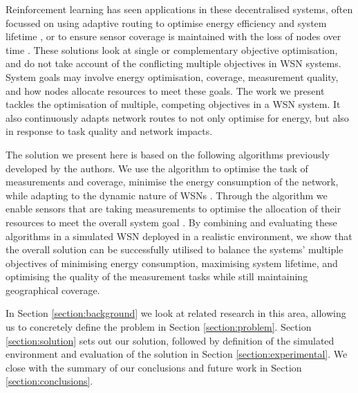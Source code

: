\ifdefined\DEBUG {} \else \fi
Reinforcement learning has seen applications in these decentralised systems, often focussed on using adaptive routing  to optimise energy efficiency and system lifetime \citep{ 10.1504/IJCNDS.2012.048871, Kulkarnib}, or to ensure sensor coverage is maintained with the loss of nodes over time \citep{Sharma2020}. These solutions look at single or complementary objective optimisation, and do not take account of the conflicting multiple objectives in WSN systems. System goals may involve energy optimisation, coverage, measurement quality, and how nodes allocate resources to meet these goals. The work we present tackles the optimisation of multiple, competing objectives in a WSN system. It also continuously adapts network routes to not only optimise for energy, but also in response to task quality and network impacts.

\ifdefined\DEBUG {} \else \fi
The solution we present here is based on the following algorithms previously developed by the authors. We use the \acronymATARIA{}{} algorithm to optimise the task of measurements and coverage, minimise the energy consumption of the network, while adapting to the dynamic nature of WSNs \citep{creech2021dynamic}. Through the \acronymMGRAO{}{} algorithm we enable sensors that are taking measurements to optimise the allocation of their resources to meet the overall system goal \citep{creech2021resource}. By combining and evaluating these algorithms in a simulated WSN deployed in a realistic environment, we show that the overall solution can be successfully utilised to balance the systems' multiple objectives of minimising energy consumption, maximising system lifetime, and optimising the quality of the measurement tasks while still maintaining geographical coverage.

\ifdefined\DEBUG {} \else \fi
In Section \ref{section:background} we look at related research in this area, allowing us to concretely define the problem in Section \ref{section:problem}. Section \ref{section:solution} sets out our solution, followed by definition of the simulated environment and evaluation of the solution in Section \ref{section:experimental}. We close with the summary of our conclusions and future work in Section \ref{section:conclusions}.
